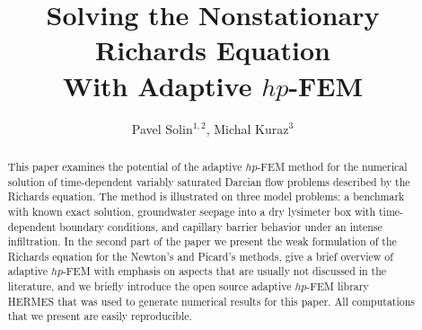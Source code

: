 \documentclass[final,3p,times,twocolumn]{elsarticle}
\begin{document}
\begin{frontmatter}



\title{Solving the Nonstationary Richards Equation\\
       With Adaptive $hp$-FEM}


\author{Pavel Solin$^{1,2}$, Michal Kuraz$^3$}

\address{${}^1$Department of Mathematics and Statistics, University of Nevada, Reno, USA}
\address{${}^2$Institute of Themomechanics, Prague, Czech Republic}
\address{${}^3$Department of Water Resources and Environmental Modeling, Czech University of Life Sciences Prague, Czech Republic}

\begin{abstract}
This paper examines the potential of the adaptive $hp$-FEM method for the 
numerical solution of time-dependent variably saturated 
Darcian flow problems described by the Richards equation. The method is 
illustrated on three model problems: a benchmark with known exact solution, 
groundwater seepage into a dry lysimeter box with time-dependent boundary 
conditions, and capillary barrier behavior under an intense infiltration. 
In the second part of the paper we present the weak formulation of the Richards equation 
for the Newton's and Picard's methods, give a brief overview of adaptive 
$hp$-FEM with emphasis on aspects that are usually not discussed in the 
literature, and we briefly introduce the open source adaptive $hp$-FEM library 
HERMES that was used to generate numerical results for this paper. All 
computations that we present are easily reproducible.
\end{abstract}


\end{frontmatter}
\end{document}
